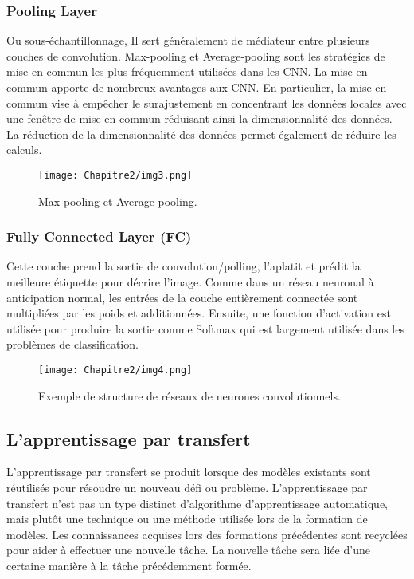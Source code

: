      \subsubsection{Pooling Layer}   
     Ou sous-échantillonnage, Il sert généralement de médiateur entre plusieurs couches de convolution. Max-pooling et Average-pooling sont les stratégies de mise en commun les plus fréquemment utilisées dans les CNN. La mise en commun apporte de nombreux avantages aux CNN. En particulier, la mise en commun vise à empêcher le surajustement en concentrant les données locales avec une fenêtre de mise en commun réduisant ainsi la dimensionnalité des données. La réduction de la dimensionnalité des données permet également de réduire les calculs.
     \begin{figure}[H]
          \centering
          \texttt{[image: Chapitre2/img3.png]}
          \caption{Max-pooling et Average-pooling.}
          \label{img3}
          \end{figure}
     
     \subsubsection{Fully Connected Layer (FC)}   
     Cette couche prend la sortie de convolution/polling, l'aplatit et prédit la meilleure étiquette pour décrire l'image. Comme dans un réseau neuronal à anticipation normal, les entrées de la couche entièrement connectée sont multipliées par les poids et additionnées. Ensuite, une fonction d'activation est utilisée pour produire la sortie comme Softmax qui est largement utilisée dans les problèmes de classification.
     \begin{figure}[H]
          \centering
          \texttt{[image: Chapitre2/img4.png]}
          \caption{Exemple de structure de réseaux de neurones convolutionnels.}
          \label{img4}
          \end{figure}

     \subsection{L'apprentissage par transfert} 
     L'apprentissage par transfert se produit lorsque des modèles existants sont réutilisés pour résoudre un nouveau défi ou problème. L'apprentissage par transfert n'est pas un type distinct d'algorithme d'apprentissage automatique, mais plutôt une technique ou une méthode utilisée lors de la formation de modèles. Les connaissances acquises lors des formations précédentes sont recyclées pour aider à effectuer une nouvelle tâche. La nouvelle tâche sera liée d'une certaine manière à la tâche précédemment formée.

